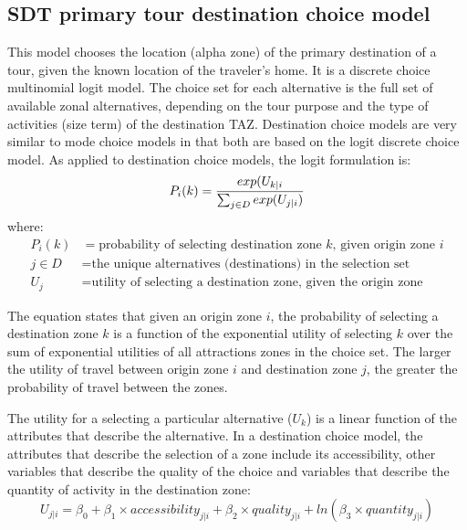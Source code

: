 \subsection{SDT primary tour destination choice model}\label{sec:sdt-primary-tour-destination}\label{sec:sdt-primary-tour-destination-choice}
This model chooses the location (alpha zone) of the primary destination of a tour, given the known location of the traveler's home. It is a discrete choice multinomial logit model. The choice set for each alternative is the full set of available zonal alternatives, depending on the tour purpose and the type of activities (size term) of the destination TAZ. Destination choice models are very similar to mode choice models in that both are based on the logit discrete choice model. As applied to destination choice models, the logit formulation is:
\begin{equation}\label{eq:7.4}
P_i (k) = {exp(U_{k|i} \over {\sum_{j \in D} exp(U_{j|i})}}
\end{equation}
where:
\begin{align*}
P_i(k) &= \text{probability of selecting destination zone $k$, given origin zone $i$} \\
j \in D &= \text{the unique alternatives (destinations) in the selection set} \\
U_j &= \text{utility of selecting a destination zone, given the origin zone}
\end{align*}

The equation states that given an origin zone $i$, the probability of selecting a destination zone $k$ is a function of the exponential utility of selecting $k$ over the sum of exponential utilities of all attractions zones in the choice set. The larger the utility of travel between origin zone $i$ and destination zone $j$, the greater the probability of travel between the zones.

The utility for a selecting a particular alternative ($U_k$) is a linear function of the attributes that describe the alternative. In a destination choice model, the attributes that describe the selection of a zone include its accessibility, other variables that describe the quality of the choice and variables that describe the quantity of activity in the destination zone:
\begin{equation}\label{eq:7.5}
U_{j|i} = \beta_0 + \beta_1 \times accessibility_{j|i} + \beta_2 \times quality_{j|i} + ln(\beta_3 \times quantity_{j|i})
\end{equation}


